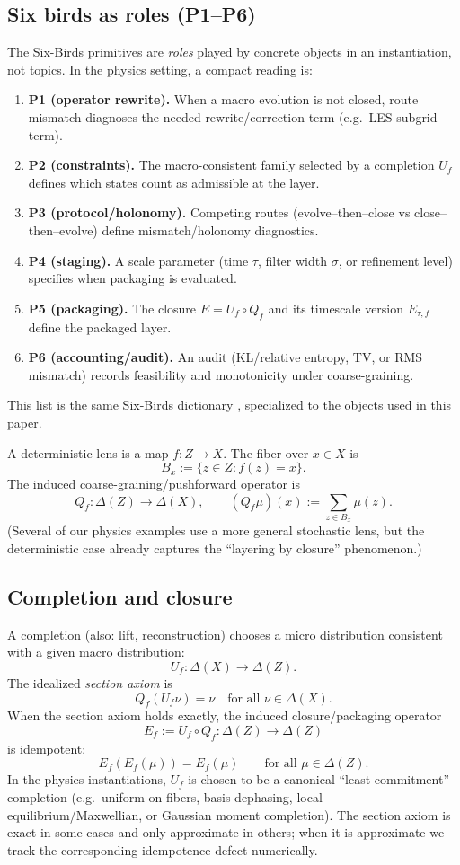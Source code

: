 \documentclass[11pt]{article}
\providecommand{\Z}{Z}
\providecommand{\X}{X}
\providecommand{\Dist}[1]{\Delta(#1)}
\providecommand{\Lens}{f}
\providecommand{\Fiber}[1]{B_{#1}}
\providecommand{\Qf}{Q_f}
\providecommand{\Uf}{U_f}
\providecommand{\Etauf}{E_{\tau,f}}
\begin{document}
\subsection{Six birds as roles (P1--P6)}
The Six-Birds primitives are \emph{roles} played by concrete objects in an instantiation, not topics. In the physics setting, a compact reading is:
\begin{enumerate}
  \item \textbf{P1 (operator rewrite).} When a macro evolution is not closed, route mismatch diagnoses the needed rewrite/correction term (e.g.\ LES subgrid term).
  \item \textbf{P2 (constraints).} The macro-consistent family selected by a completion $\Uf$ defines which states count as admissible at the layer.
  \item \textbf{P3 (protocol/holonomy).} Competing routes (evolve--then--close vs close--then--evolve) define mismatch/holonomy diagnostics.
  \item \textbf{P4 (staging).} A scale parameter (time $\tau$, filter width $\sigma$, or refinement level) specifies when packaging is evaluated.
  \item \textbf{P5 (packaging).} The closure $E=\Uf\circ\Qf$ and its timescale version $\Etauf$ define the packaged layer.
  \item \textbf{P6 (accounting/audit).} An audit (KL/relative entropy, TV, or RMS mismatch) records feasibility and monotonicity under coarse-graining.
\end{enumerate}
This list is the same Six-Birds dictionary \citep{SixBirdsFramework}, specialized to the objects used in this paper.

A deterministic lens is a map $\Lens:\Z\to\X$. The fiber over $x\in\X$ is
\[
  \Fiber{x} := \{ z\in\Z : \Lens(z)=x \}.
\]
The induced coarse-graining/pushforward operator is
\[
  \Qf : \Dist{\Z}\to\Dist{\X},\qquad
  (\Qf \mu)(x) := \sum_{z\in \Fiber{x}} \mu(z).
\]
(Several of our physics examples use a more general stochastic lens, but the deterministic case already captures the ``layering by closure'' phenomenon.)

\subsection{Completion and closure}
A completion (also: lift, reconstruction) chooses a micro distribution consistent with a given macro distribution:
\[
  \Uf : \Dist{\X}\to\Dist{\Z}.
\]
The idealized \emph{section axiom} is
\[
  \Qf(\Uf \nu)=\nu \quad \text{for all }\nu\in\Dist{\X}.
\]
When the section axiom holds exactly, the induced closure/packaging operator
\[
  E_f := \Uf\circ \Qf : \Dist{\Z}\to\Dist{\Z}
\]
is idempotent:
\[
  E_f(E_f(\mu)) = E_f(\mu)\qquad\text{for all }\mu\in\Dist{\Z}.
\]
In the physics instantiations, $\Uf$ is chosen to be a canonical ``least-commit\-ment'' completion (e.g.\ uniform-on-fibers, basis dephasing, local equilibrium/\linebreak Maxwellian, or Gaussian moment completion). The section axiom is exact in some cases and only approximate in others; when it is approximate we track the corresponding idempotence defect numerically.
\end{document}
